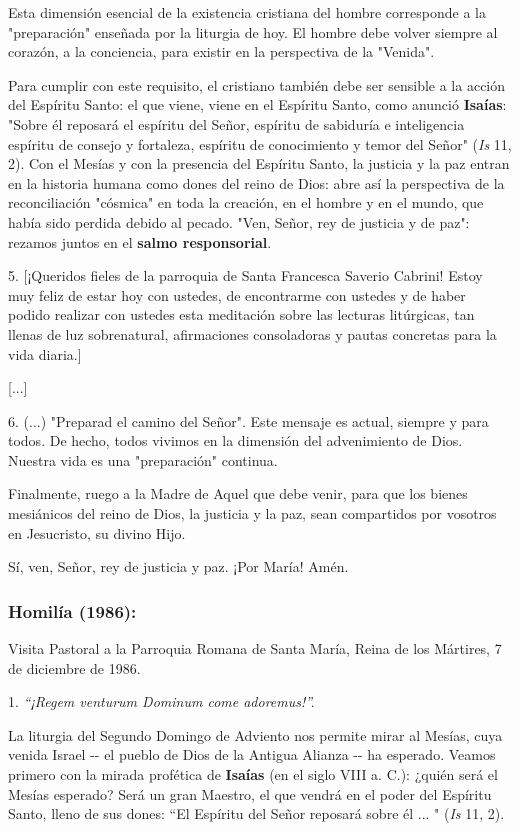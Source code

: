 Esta dimensión esencial de la existencia cristiana del hombre
corresponde a la "preparación" enseñada por la liturgia de hoy. El
hombre debe volver siempre al corazón, a la conciencia, para existir en
la perspectiva de la "Venida".

Para cumplir con este requisito, el cristiano también debe ser sensible
a la acción del Espíritu Santo: el que viene, viene en el Espíritu
Santo, como anunció \textbf{Isaías}: "Sobre él reposará el espíritu del
Señor, espíritu de sabiduría e inteligencia espíritu de consejo y
fortaleza, espíritu de conocimiento y temor del Señor" (\emph{Is} 11,
2). Con el Mesías y con la presencia del Espíritu Santo, la justicia y
la paz entran en la historia humana como dones del reino de Dios: abre
así la perspectiva de la reconciliación "cósmica" en toda la creación,
en el hombre y en el mundo, que había sido perdida debido al pecado.
"Ven, Señor, rey de justicia y de paz": rezamos juntos en el
\textbf{salmo responsorial}.

5. {[}¡Queridos fieles de la parroquia de Santa Francesca Saverio
Cabrini! Estoy muy feliz de estar hoy con ustedes, de encontrarme con
ustedes y de haber podido realizar con ustedes esta meditación sobre las
lecturas litúrgicas, tan llenas de luz sobrenatural, afirmaciones
consoladoras y pautas concretas para la vida diaria.{]}

{[}...{]}

6. (...) "Preparad el camino del Señor". Este mensaje es actual, siempre
y para todos. De hecho, todos vivimos en la dimensión del advenimiento
de Dios. Nuestra vida es una "preparación" continua.

Finalmente, ruego a la Madre de Aquel que debe venir, para que los
bienes mesiánicos del reino de Dios, la justicia y la paz, sean
compartidos por vosotros en Jesucristo, su divino Hijo.

Sí, ven, Señor, rey de justicia y paz. ¡Por María! Amén.


\subsubsection{Homilía (1986): }

Visita Pastoral a la Parroquia Romana de Santa María, Reina de los
Mártires, 7 de diciembre de 1986.

1. \emph{``¡Regem venturum Dominum come adoremus!''.}

La liturgia del Segundo Domingo de Adviento nos permite mirar al Mesías,
cuya venida Israel -\/- el pueblo de Dios de la Antigua Alianza -\/- ha
esperado. Veamos primero con la mirada profética de \textbf{Isaías} (en
el siglo VIII a. C.): ¿quién será el Mesías esperado? Será un gran
Maestro, el que vendrá en el poder del Espíritu Santo, lleno de sus
dones: ``El Espíritu del Señor reposará sobre él ... " (\emph{Is} 11,
2).

